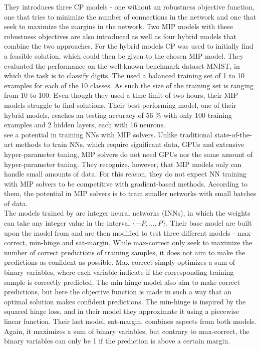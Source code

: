 \noindent They introduces three CP models - one without an robustness objective function, one that tries to minimize the number of connections in the network and one that seek to maximize the margins in the network. Two MIP models with these robustness objectives are also introduced as well as four hybrid models that combine the two approaches. For the hybrid models CP was used to initially find a feasible solution, which could then be given to the chosen MIP model. They evaluated the performance on the well-known benchmark dataset MNIST, in which the task is to classify digits. The used a balanced training set of 1 to 10 examples for each of the 10 classes. As such the size of the training set is ranging from 10 to 100. Even though they used a time-limit of two hours, their MIP models struggle to find solutions. Their best performing model, one of their hybrid models, reaches an testing accuracy of 56 \% with only 100 training examples and 2 hidden layers, each with 16 neurons. \\

\noindent \cite{thorbjarnason2023} see a potential in training NNs with MIP solvers. Unlike traditional state-of-the-art methods to train NNs, which require significant data, GPUs and extensive hyper-parameter tuning, MIP solvers do not need GPUs nor the same amount of hyper-parameter tuning. They recognize, however, that MIP models only can handle small amounts of data. For this reason, they do not expect NN training with MIP solvers to be competitive with gradient-based methods. According to them, the potential in MIP solvers is to train smaller networks with small batches of data. \\

\noindent The models trained by \cite{thorbjarnason2023} are integer neural networks (INNs), in which the weights can take any integer value in the interval $ \{-P, \ldots, P \}$. Their base model are built upon the model from \cite{icarte2019} and are then modified to test three different models - max-correct, min-hinge and sat-margin. While max-correct only seek to maximize the number of correct predictions of training samples, it does not aim to make the predictions as confident as possible. Max-correct simply optimizes a sum of binary variables, where each variable indicate if the corresponding training sample is correctly predicted. The min-hinge model also aim to make correct predictions, but here the objective function is made in such a way that an optimal solution makes confident predictions. The min-hinge is inspired by the squared hinge loss, and in their model they approximate it using a piecewise linear function. Their last model, sat-margin, combines aspects from both models. Again, it maximizes a sum of binary variables, but contrary to max-correct, the binary variables can only be 1 if the prediction is above a certain margin. \\

